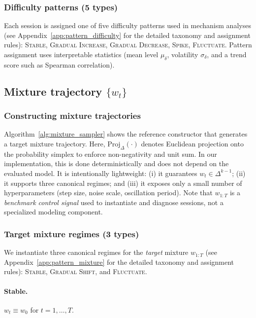 \subsubsection{Difficulty patterns (5 types)}
\label{app:difficulty_patterns}

Each session is assigned one of five difficulty patterns used in mechanism analyses (see Appendix~\ref{app:pattern_difficulty} for the detailed taxonomy and assignment rules):
\textsc{Stable}, \textsc{Gradual Increase}, \textsc{Gradual Decrease}, \textsc{Spike}, \textsc{Fluctuate}.
Pattern assignment uses interpretable statistics (mean level $\mu_\delta$, volatility $\sigma_\delta$, and a trend score such as Spearman correlation).

\subsection{Mixture trajectory $\{w_t\}$}
\label{app:mixture_trajectory}

\subsubsection{Constructing mixture trajectories}
\label{app:mix_generation}
Algorithm~\ref{alg:mixture_sampler} shows the reference constructor that generates a target mixture trajectory. Here, $\mathrm{Proj}_\Delta(\cdot)$ denotes Euclidean projection onto the probability simplex to enforce non-negativity and unit sum. In our implementation, this is done deterministically and does not depend on the evaluated model.
It is intentionally lightweight: (i) it guarantees $w_t\in\Delta^{k-1}$; (ii) it supports three canonical regimes; and (iii) it exposes only a small number of hyperparameters (step size, noise scale, oscillation period). Note that $w_{1:T}$ is a \emph{benchmark control signal} used to instantiate and diagnose sessions, not a specialized modeling component.

\subsubsection{Target mixture regimes (3 types)}
\label{app:mixture_regimes}

We instantiate three canonical regimes for the \emph{target} mixture $w_{1:T}$ (see Appendix~\ref{app:pattern_mixture} for the detailed taxonomy and assignment rules): \textsc{Stable}, \textsc{Gradual Shift}, and \textsc{Fluctuate}.

\paragraph{Stable.}
$w_t\equiv w_0$ for $t=1,\ldots,T$.


